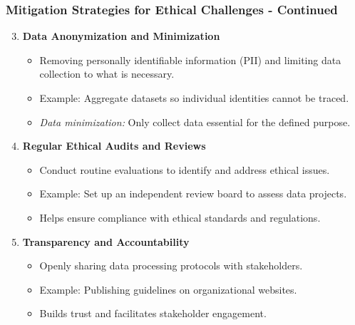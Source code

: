 \documentclass{beamer}
\begin{document}
\begin{frame}[fragile]
    \frametitle{Mitigation Strategies for Ethical Challenges - Continued}
    \begin{enumerate}
        \setcounter{enumi}{2}
        \item \textbf{Data Anonymization and Minimization}
        \begin{itemize}
            \item Removing personally identifiable information (PII) and limiting data collection to what is necessary.
            \item Example: Aggregate datasets so individual identities cannot be traced.
            \item \textit{Data minimization:} Only collect data essential for the defined purpose.
        \end{itemize}

        \item \textbf{Regular Ethical Audits and Reviews}
        \begin{itemize}
            \item Conduct routine evaluations to identify and address ethical issues.
            \item Example: Set up an independent review board to assess data projects.
            \item Helps ensure compliance with ethical standards and regulations.
        \end{itemize}

        \item \textbf{Transparency and Accountability}
        \begin{itemize}
            \item Openly sharing data processing protocols with stakeholders.
            \item Example: Publishing guidelines on organizational websites.
            \item Builds trust and facilitates stakeholder engagement.
        \end{itemize}
    \end{enumerate}
\end{frame}
\end{document}
